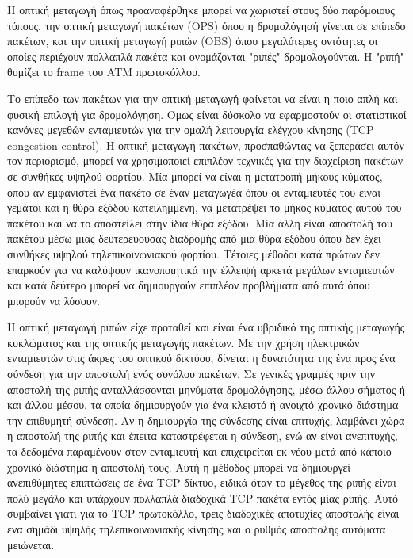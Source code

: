 Η οπτική μεταγωγή όπως προαναφέρθηκε μπορεί να χωριστεί στους δύο
παρόμοιους τύπους, την οπτική μεταγωγή πακέτων (OPS) όπου η
δρομολόγησή γίνεται σε επίπεδο πακέτων, και την οπτική μεταγωγή ριπών
(OBS) όπου μεγαλύτερες οντότητες οι οποίες περιέχουν πολλαπλά πακέτα
και ονομάζονται "ριπές" δρομολογούνται. Η "ριπή" θυμίζει το frame του
ATM πρωτοκόλλου.

Το επίπεδο των πακέτων για την οπτική μεταγωγή φαίνεται να είναι η
ποιο απλή και φυσική επιλογή για δρομολόγηση. Όμως είναι δύσκολο να
εφαρμοστούν οι στατιστικοί κανόνες μεγεθών ενταμιευτών για την ομαλή
λειτουργία ελέγχου κίνησης (TCP congestion control). Η οπτική μεταγωγή
πακέτων, προσπαθώντας να ξεπεράσει αυτόν τον περιορισμό, μπορεί να
χρησιμοποιεί επιπλέον τεχνικές για την διαχείριση πακέτων σε συνθήκες
υψηλού φορτίου. Μία μπορεί να είναι η μετατροπή μήκους κύματος, όπου
αν εμφανιστεί ένα πακέτο σε έναν μεταγωγέα όπου οι ενταμιευτές του
είναι γεμάτοι και η θύρα εξόδου κατειλημμένη, να μετατρέψει το μήκος
κύματος αυτού του πακέτου και να το αποστείλει στην ίδια θύρα
εξόδου. Μία άλλη είναι αποστολή του πακέτου μέσω μιας δευτερεύουσας
διαδρομής από μια θύρα εξόδου όπου δεν έχει συνθήκες υψηλού
τηλεπικοινωνιακού φορτίου. Τέτοιες μέθοδοι κατά πρώτων δεν επαρκούν
για να καλύψουν ικανοποιητικά την έλλειψή αρκετά μεγάλων ενταμιευτών
και κατά δεύτερο μπορεί να δημιουργούν επιπλέον προβλήματα από αυτά
όπου μπορούν να λύσουν.

Η οπτική μεταγωγή ριπών είχε προταθεί \cite{} και είναι ένα υβριδικό
της οπτικής μεταγωγής κυκλώματος και της οπτικής μεταγωγής πακέτων. Με
την χρήση ηλεκτρικών ενταμιευτών στις άκρες του οπτικού δικτύου,
δίνεται η δυνατότητα της ένα προς ένα σύνδεση για την αποστολή ενός
συνόλου πακέτων. Σε γενικές γραμμές πριν την αποστολή της ριπής
ανταλλάσσονται μηνύματα δρομολόγησης, μέσω άλλου σήματος ή και άλλου
μέσου, τα οποία δημιουργούν για ένα κλειστό ή ανοιχτό χρονικό διάστημα
την επιθυμητή σύνδεση. Αν η δημιουργία της σύνδεσης είναι επιτυχής,
λαμβάνει χώρα η αποστολή της ριπής και έπειτα καταστρέφεται η σύνδεση,
ενώ αν είναι ανεπιτυχής, τα δεδομένα παραμένουν στον ενταμιευτή και
επιχειρείται εκ νέου μετά από κάποιο χρονικό διάστημα η αποστολή
τους. Αυτή η μέθοδος μπορεί να δημιουργεί ανεπιθύμητες επιπτώσεις σε
ένα TCP δίκτυο, ειδικά όταν το μέγεθος της ριπής είναι πολύ μεγάλο και
υπάρχουν πολλαπλά διαδοχικά TCP πακέτα εντός μίας ριπής. Αυτό
συμβαίνει γιατί για το TCP πρωτοκόλλο, τρεις διαδοχικές αποτυχίες
αποστολής είναι ένα σημάδι υψηλής τηλεπικοινωνιακής κίνησης και ο
ρυθμός αποστολής αυτόματα μειώνεται.

